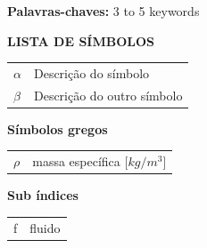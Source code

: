 \documentclass[a4paper,12pt,oneside]{article}
\numberwithin{equation}{section}
\begin{document}
\vspace*{1cm}
\textbf{Palavras-chaves:} 3 to 5 keywords



\newpage
\thispagestyle{empty}
\vspace*{-33pt}
\renewcommand\contentsname{\centering\Large ÍNDICE}
\tableofcontents



\newpage
\thispagestyle{empty}
\vspace*{-33pt}
\listoffigures



\newpage
\thispagestyle{empty}
\vspace*{-33pt}
\listoftables

\newpage
\thispagestyle{empty}
\begin{center}
	\textbf{\Large{LISTA DE SÍMBOLOS}}
\end{center}


\begin{changemargin}{1.5cm}{1.5cm} 
	\begin{tabular}{ll}
		$\alpha$ 	&	Descrição do símbolo\\
		$\beta$ 	&	Descrição do outro símbolo\\
	\end{tabular}
\end{changemargin}

\textbf{Símbolos gregos}
\begin{changemargin}{1.5cm}{1.5cm} 
	\begin{tabular}{ll}
		$\rho$ 	&	massa específica [$kg/m^{3}$]\\
		
	\end{tabular}
\end{changemargin}

\textbf{Sub índices}
\begin{changemargin}{1.5cm}{1.5cm} 
	\begin{tabular}{ll}
		f 	&	fluido\\
		
	\end{tabular}
\end{changemargin}
\end{document}
